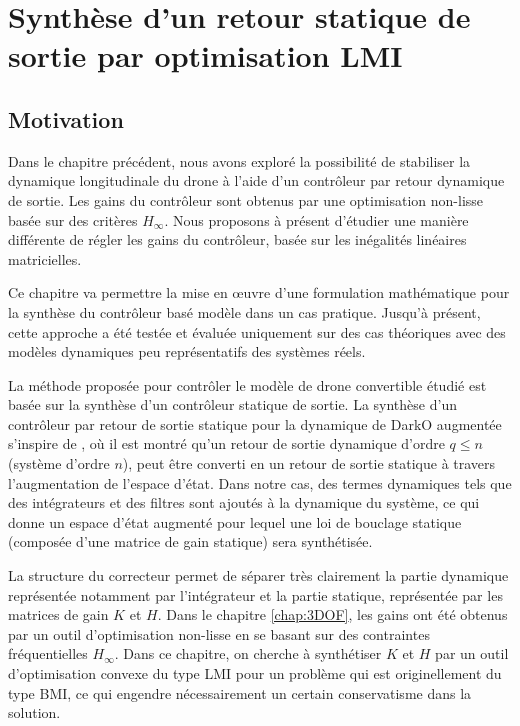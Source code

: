 \chapter{Synthèse d'un retour statique de sortie par optimisation LMI}
\minitoc
\label{chap:LMI}

\section{Motivation}
\label{sec:motivationLMI}

Dans le chapitre précédent, nous avons exploré la possibilité de stabiliser la dynamique longitudinale du drone à l'aide d'un contrôleur par retour dynamique de sortie. Les gains du contrôleur sont obtenus par une optimisation non-lisse basée sur des critères $H_{\infty}$. Nous proposons à présent d'étudier une manière différente de régler les gains du contrôleur, basée sur les inégalités linéaires matricielles.

Ce chapitre va permettre la mise en œuvre d'une formulation mathématique pour la synthèse du contrôleur basé modèle dans un cas pratique. Jusqu'à présent, cette approche a été testée et évaluée uniquement sur des cas théoriques \cite{Arzelier2018} avec des modèles dynamiques peu représentatifs des systèmes réels. 

La méthode proposée pour contrôler le modèle de drone convertible étudié est basée sur la synthèse d'un contrôleur statique de sortie. La synthèse d'un contrôleur par retour de sortie statique pour la dynamique de DarkO augmentée s'inspire de \cite{SYRMOS1997125}, où il est montré qu'un retour de sortie dynamique d'ordre $q \leq n$ (système d'ordre $n$), peut être converti en un retour de sortie statique à travers l'augmentation de l'espace d'état. Dans notre cas, des termes dynamiques tels que des intégrateurs et des filtres sont ajoutés à la dynamique du système, ce qui donne un espace d'état augmenté pour lequel une loi de bouclage statique (composée d'une matrice de gain statique) sera synthétisée.

La structure du correcteur permet de séparer  très clairement la partie dynamique représentée notamment par l'intégrateur et la partie statique, représentée par les matrices de gain $K$ et $H$. Dans le chapitre \ref{chap:3DOF}, les gains ont été obtenus par un outil d'optimisation non-lisse en se basant sur des contraintes fréquentielles $H_{\infty}$. Dans ce chapitre, on cherche à synthétiser $K$ et $H$ par un outil d'optimisation convexe du type LMI pour un problème qui est originellement du type BMI, ce qui engendre nécessairement un certain conservatisme dans la solution.


